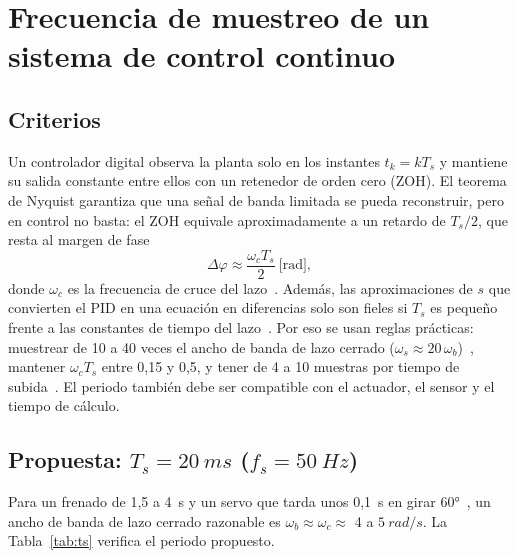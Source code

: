 \section{Frecuencia de muestreo de un sistema de control continuo}
\label{sec:p2}

\subsection{Criterios}
Un controlador digital observa la planta solo en los instantes $t_k=kT_s$ y mantiene su salida
constante entre ellos con un retenedor de orden cero (ZOH). El teorema de Nyquist garantiza que una
señal de banda limitada se pueda reconstruir, pero en control no basta: el ZOH equivale
aproximadamente a un retardo de $T_s/2$, que resta al margen de fase
\begin{equation}
  \Delta\varphi \approx \frac{\omega_c T_s}{2}\ \text{[rad]},
  \label{eq:fase_zoh}
\end{equation}
donde $\omega_c$ es la frecuencia de cruce del lazo~\cite{franklin1998digital,astrom1997computer}.
Además, las aproximaciones de $s$ que convierten el PID en una ecuación en diferencias solo son
fieles si $T_s$ es pequeño frente a las constantes de tiempo del lazo~\cite{ogata1996discreto}.
Por eso se usan reglas prácticas: muestrear de 10 a 40 veces el ancho de banda de lazo cerrado
($\omega_s\approx 20\,\omega_b$)~\cite{franklin1998digital}, mantener $\omega_c T_s$ entre 0,15 y
0,5, y tener de 4 a 10 muestras por tiempo de subida~\cite{astrom1997computer}. El periodo también
debe ser compatible con el actuador, el sensor y el tiempo de cálculo.

\subsection{Propuesta: $T_s=\SI{20}{ms}$ ($f_s=\SI{50}{Hz}$)}
Para un frenado de 1,5 a 4~s y un servo que tarda unos 0,1~s en girar 60°~\cite{mg90s}, un ancho
de banda de lazo cerrado razonable es $\omega_b\approx\omega_c\approx$ 4 a $\SI{5}{rad/s}$. La
Tabla~\ref{tab:ts} verifica el periodo propuesto.

